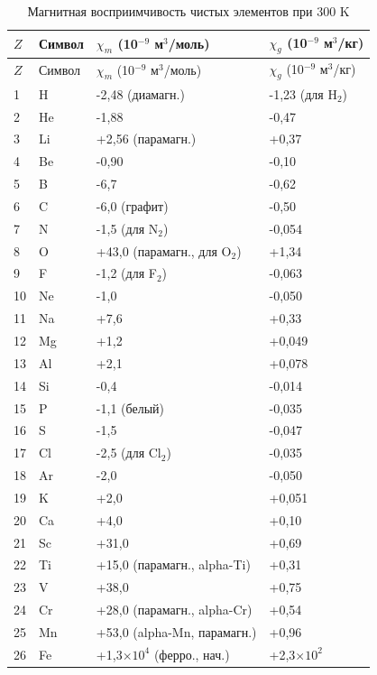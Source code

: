 \documentclass[12pt,a4paper]{article}
\begin{document}
	\begin{longtable}{p{0.6cm}p{1.2cm}p{2.5cm}p{2.5cm}}
		\caption{Магнитная восприимчивость чистых элементов при 300 K} \label{tab:magnetic-susceptibility-all} \\
		\toprule
		\(Z\) & Символ & \(\chi_m\) (10\(^{-9}\) м\(^3\)/моль) & \(\chi_g\) (10\(^{-9}\) м\(^3\)/кг) \\
		\midrule
		\endfirsthead
		\toprule
		\(Z\) & Символ & \(\chi_m\) (10\(^{-9}\) м\(^3\)/моль) & \(\chi_g\) (10\(^{-9}\) м\(^3\)/кг) \\
		\midrule
		\endhead
		1  & H  & -2,48 (диамагн.) & -1,23 (для H\(_2\)) \\
		2  & He & -1,88 & -0,47 \\
		3  & Li & +2,56 (парамагн.) & +0,37 \\
		4  & Be & -0,90 & -0,10 \\
		5  & B  & -6,7 & -0,62 \\
		6  & C  & -6,0 (графит) & -0,50 \\
		7  & N  & -1,5 (для N\(_2\)) & -0,054 \\
		8  & O  & +43,0 (парамагн., для O\(_2\)) & +1,34 \\
		9  & F  & -1,2 (для F\(_2\)) & -0,063 \\
		10 & Ne & -1,0 & -0,050 \\
		11 & Na & +7,6 & +0,33 \\
		12 & Mg & +1,2 & +0,049 \\
		13 & Al & +2,1 & +0,078 \\
		14 & Si & -0,4 & -0,014 \\
		15 & P  & -1,1 (белый) & -0,035 \\
		16 & S  & -1,5 & -0,047 \\
		17 & Cl & -2,5 (для Cl\(_2\)) & -0,035 \\
		18 & Ar & -2,0 & -0,050 \\
		19 & K  & +2,0 & +0,051 \\
		20 & Ca & +4,0 & +0,10 \\
		21 & Sc & +31,0 & +0,69 \\
		22 & Ti & +15,0 (парамагн., alpha-Ti) & +0,31 \\
		23 & V  & +38,0 & +0,75 \\
		24 & Cr & +28,0 (парамагн., alpha-Cr) & +0,54 \\
		25 & Mn & +53,0 (alpha-Mn, парамагн.) & +0,96 \\
		26 & Fe & +1,3\(\times10^4\) (ферро., нач.) & +2,3\(\times10^2\) \\

\end{longtable}
\end{document}
